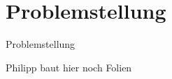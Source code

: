 \section{Problemstellung}
%
\begin{frame}{}
	\begin{center}
		\huge{Problemstellung}
	\end{center}
\end{frame}
%
\begin{frame}{}
	\begin{itemizes}{1em}
		\item 
		\item Philipp baut hier noch Folien
		\item 
	\end{itemizes}
\end{frame}
%
